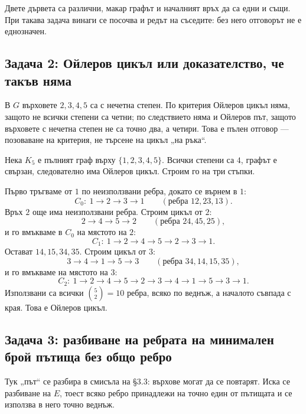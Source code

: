 \begin{remark}
Двете дървета са различни, макар графът и началният връх да са едни и същи. При
такава задача винаги се посочва и редът на съседите: без него отговорът не е
еднозначен.
\end{remark}

\subsection{Задача 2: Ойлеров цикъл или доказателство, че такъв няма}\label{s:3.7.2}

\begin{example}
В $G$ върховете $2,3,4,5$ са с нечетна степен. По критерия Ойлеров цикъл няма,
защото не всички степени са четни; по следствието няма и Ойлеров път, защото
върховете с нечетна степен не са точно два, а четири. Това е пълен отговор ---
позоваване на критерия, не търсене на цикъл „на ръка“.
\end{example}

\begin{example}
Нека $K_5$ е пълният граф върху $\{1,2,3,4,5\}$. Всички степени са $4$, графът е
свързан, следователно има Ойлеров цикъл. Строим го на три стъпки.

Първо тръгваме от $1$ по неизползвани ребра, докато се върнем в $1$:
\[
C_0:\ 1\to 2\to 3\to 1
\qquad(\text{ребра } 12,23,13).
\]
Връх $2$ още има неизползвани ребра. Строим цикъл от $2$:
\[
2\to 4\to 5\to 2
\qquad(\text{ребра } 24,45,25),
\]
и го вмъкваме в $C_0$ на мястото на $2$:
\[
C_1:\ 1\to 2\to 4\to 5\to 2\to 3\to 1 .
\]
Остават $14,15,34,35$. Строим цикъл от $3$:
\[
3\to 4\to 1\to 5\to 3
\qquad(\text{ребра } 34,14,15,35),
\]
и го вмъкваме на мястото на $3$:
\[
C_2:\ 1\to 2\to 4\to 5\to 2\to 3\to 4\to 1\to 5\to 3\to 1 .
\]
Използвани са всички $\binom{5}{2}=10$ ребра, всяко по веднъж, а началото
съвпада с края. Това е Ойлеров цикъл.
\end{example}

\subsection{Задача 3: разбиване на ребрата на минимален брой пътища без общо ребро}\label{s:3.7.3}

Тук „път“ се разбира в смисъла на \S3.3: върхове могат да се повтарят. Иска се
разбиване на $E$, тоест всяко ребро принадлежи на точно един от пътищата и се
използва в него точно веднъж.

